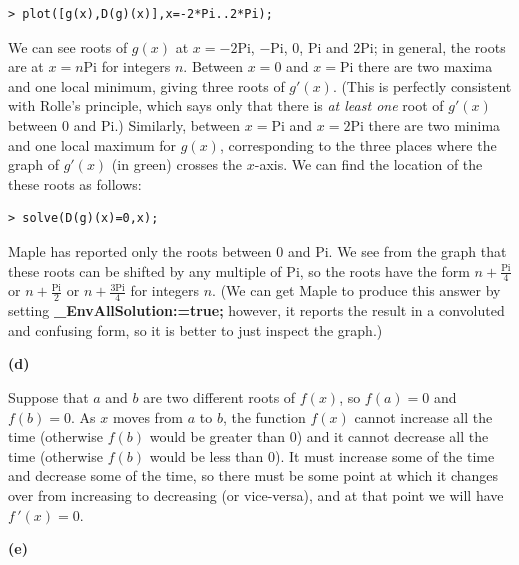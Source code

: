\documentclass{article}
\begin{document}
\begin{lstlisting}
> plot([g(x),D(g)(x)],x=-2*Pi..2*Pi);
\end{lstlisting}
\begin{Maple Normal}
We can see roots of 
$g (x)$ at 
$x =-2 \mathrm{Pi}$, 
$-\mathrm{Pi}$, 
$0$, 
$\mathrm{Pi}$ and 
$2 \mathrm{Pi}$; in general, the roots are at 
$x =n \mathrm{Pi}$ for integers 
$n $.  Between 
$x =0$ and 
$x =\mathrm{Pi}$ there are two maxima and one local minimum, giving three roots of 
$\mathit{g'} (x)$.  (This is perfectly consistent with Rolle's principle, which says only that there is \textit{at least one} root of 
$\mathit{g'} (x)$ between 
$0$ and 
$\mathrm{Pi}$.)  Similarly, between 
$x =\mathrm{Pi}$ and 
$x =2 \mathrm{Pi}$ there are two minima and one local maximum for 
$g (x)$, corresponding to the three places where the graph of 
$\mathit{g'} (x)$ (in green) crosses the 
$x $-axis.  We can find the location of the these roots as follows:
\end{Maple Normal}
\begin{lstlisting}
> solve(D(g)(x)=0,x);
\end{lstlisting}
\begin{Maple Normal}
Maple has reported only the roots between 
$0$ and 
$\mathrm{Pi}$.  We see from the graph that these roots can be shifted by any multiple of 
$\mathrm{Pi}$, so the roots have the form 
$n +\frac{\mathrm{Pi}}{4}$ or 
$n +\frac{\mathrm{Pi}}{2}$ or 
$n +\frac{3 \mathrm{Pi}}{4}$ for integers 
$n $.  (We can get Maple to produce this answer by setting \textcolor[RGB]{255,0,0}{\textbf{\_EnvAllSolution:=true;}} however, it reports the result in a convoluted and confusing form, so it is better to just inspect the graph.)
\end{Maple Normal}
\begin{Maple Normal}
\textbf{(d)}
\end{Maple Normal}
\begin{Maple Normal}
Suppose that 
$a $ and 
$b $ are two different roots of 
$f (x)$, so 
$f (a)=0$ and 
$f (b)=0$.  As 
$x $ moves from 
$a $ to 
$b $, the function 
$f (x)$ cannot increase all the time (otherwise 
$f (b)$ would be greater than 0) and it cannot decrease all the time (otherwise 
$f (b)$ would be less than 0).  It must increase some of the time and decrease some of the time, so there must be some point at which it changes over from increasing to decreasing (or vice-versa), and at that point we will have 
$\mathit{f\,'} (x)=0$.
\end{Maple Normal}
\begin{Maple Normal}
\textbf{(e)}
\end{Maple Normal}
\end{document}
